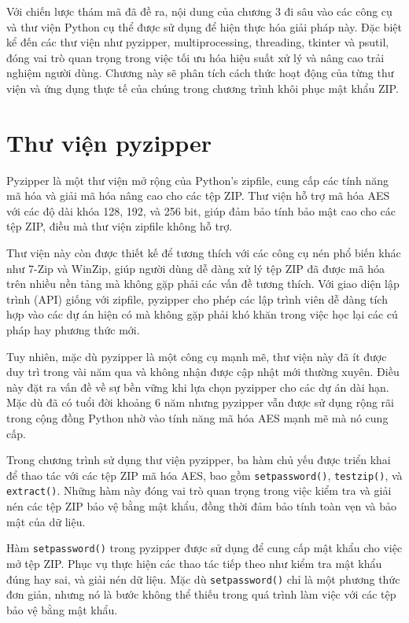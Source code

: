 \documentclass[../DoAn.tex]{subfiles}
\begin{document}
Với chiến lược thám mã đã đề ra, nội dung của chương 3 đi sâu vào các công cụ và thư viện Python cụ thể được sử dụng để hiện thực hóa giải pháp này. Đặc biệt kể đến các thư viện như pyzipper, multiprocessing, threading, tkinter và psutil, đóng vai trò quan trọng trong việc tối ưu hóa hiệu suất xử lý và nâng cao trải nghiệm người dùng. Chương này sẽ phân tích cách thức hoạt động của từng thư viện và ứng dụng thực tế của chúng trong chương trình khôi phục mật khẩu ZIP.

\section{Thư viện pyzipper}
\label{section:3.1}

Pyzipper là một thư viện mở rộng của Python’s zipfile, cung cấp các tính năng mã hóa và giải mã hóa nâng cao cho các tệp ZIP. Thư viện hỗ trợ mã hóa AES với các độ dài khóa 128, 192, và 256 bit, giúp đảm bảo tính bảo mật cao cho các tệp ZIP, điều mà thư viện zipfile không hỗ trợ.

Thư viện này còn được thiết kế để tương thích với các công cụ nén phổ biến khác như 7-Zip và WinZip, giúp người dùng dễ dàng xử lý tệp ZIP đã được mã hóa trên nhiều nền tảng mà không gặp phải các vấn đề tương thích. Với giao diện lập trình (API) giống với zipfile, pyzipper cho phép các lập trình viên dễ dàng tích hợp vào các dự án hiện có mà không gặp phải khó khăn trong việc học lại các cú pháp hay phương thức mới.

Tuy nhiên, mặc dù pyzipper là một công cụ mạnh mẽ, thư viện này đã ít được duy trì trong vài năm qua và không nhận được cập nhật mới thường xuyên. Điều này đặt ra vấn đề về sự bền vững khi lựa chọn pyzipper cho các dự án dài hạn. Mặc dù đã có tuổi đời khoảng 6 năm nhưng pyzipper vẫn được sử dụng rộng rãi trong cộng đồng Python nhờ vào tính năng mã hóa AES mạnh mẽ mà nó cung cấp.

Trong chương trình sử dụng thư viện pyzipper, ba hàm chủ yếu được triển khai để thao tác với các tệp ZIP mã hóa AES, bao gồm \verb|setpassword()|, \verb|testzip()|, và \verb|extract()|. Những hàm này đóng vai trò quan trọng trong việc kiểm tra và giải nén các tệp ZIP bảo vệ bằng mật khẩu, đồng thời đảm bảo tính toàn vẹn và bảo mật của dữ liệu. 

Hàm \verb|setpassword()| trong pyzipper được sử dụng để cung cấp mật khẩu cho việc mở tệp ZIP. Phục vụ thực hiện các thao tác tiếp theo như kiểm tra mật khẩu đúng hay sai, và giải nén dữ liệu. Mặc dù \verb|setpassword()| chỉ là một phương thức đơn giản, nhưng nó là bước không thể thiếu trong quá trình làm việc với các tệp bảo vệ bằng mật khẩu.
\end{document}
